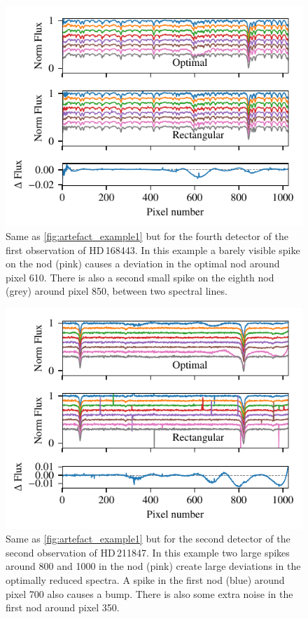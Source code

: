 \begin{figure}
    \centering
    \includegraphics[width=0.7\linewidth]{figures/appendix/bp_plots/extraction_comparision_HD168443-1_chip_4}
    \caption{Same as \cref{fig:artefact_example1} but for the fourth detector of the first observation of {HD\,168443}.
    In this example a barely visible spike on the   nod (pink) causes a deviation in the optimal nod around pixel 610.
    There is also a second small spike on the eighth nod (grey) around pixel 850, between two spectral lines.}
    \label{fig:artefact_example5}
\end{figure}
\begin{figure}
    \centering
    \includegraphics[width=0.7\linewidth]{figures/appendix/bp_plots/extraction_comparision_HD211847-2_chip_2}
    \caption{Same as \cref{fig:artefact_example1} but for the second detector of the second observation of {HD\,211847}.
    In this example two large spikes around 800 and 1000 in the  nod (pink) create large deviations in the optimally reduced spectra.
    A spike in the first nod (blue) around pixel 700 also causes a bump.
    There is also some extra noise in the first nod around pixel 350.}
    \label{fig:artefact_example6}
\end{figure}
